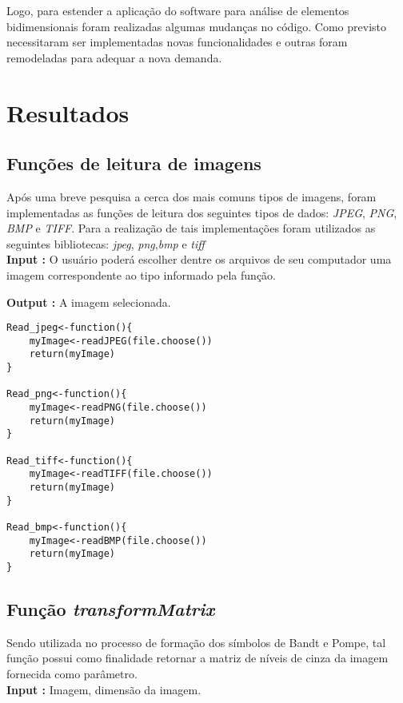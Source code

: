 \documentclass[12pt,letterpaper]{article}
\begin{document}
Logo, para estender a aplicação do software para análise de elementos bidimensionais foram realizadas algumas mudanças no código. Como previsto necessitaram ser implementadas novas funcionalidades e outras foram remodeladas para adequar a nova demanda.

\section{Resultados}

\subsection{Funções de leitura de imagens}

Após uma breve pesquisa a cerca dos mais comuns tipos de imagens, foram implementadas as funções de leitura dos seguintes tipos de dados:  \textit{JPEG}, \textit{PNG}, \textit{BMP} e \textit{TIFF}. Para a realização de tais implementações foram utilizados as seguintes bibliotecas:  \textit{jpeg}, \textit{png},\textit{bmp} e \textit{tiff} \\

\textbf{Input :} O usuário poderá escolher dentre os arquivos de seu computador uma imagem correspondente ao tipo informado pela função.

\textbf{Output :} A imagem selecionada.\\

\begin{lstlisting}
Read_jpeg<-function(){
	myImage<-readJPEG(file.choose())
	return(myImage)
}

Read_png<-function(){
	myImage<-readPNG(file.choose())
	return(myImage)
}

Read_tiff<-function(){
	myImage<-readTIFF(file.choose())
	return(myImage)
}

Read_bmp<-function(){
	myImage<-readBMP(file.choose())
	return(myImage)
}
\end{lstlisting}

\subsection{Função \textit{transformMatrix}}

Sendo utilizada no processo de formação dos símbolos de Bandt e Pompe, tal função possui como finalidade retornar a matriz de níveis de cinza da imagem fornecida como parâmetro.\\

\textbf{Input :} Imagem, dimensão da imagem.
\end{document}
